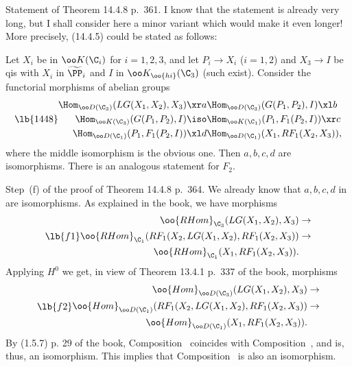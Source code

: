 \documentclass[12pt]{article}
\theoremstyle{remark}
\theoremstyle{definition}
\begin{document}
\begin{s}%
Statement of Theorem 14.4.8 p.~361. I know that the statement is already very long, but I shall consider here a minor variant which would make it even longer! More precisely, (14.4.5) could be stated as follows:

Let $X_i$ be in $\oo K(\C_i)$ for $i=1,2,3$, and let $P_i\to X_i$ ($i=1,2$) and $X_3\to I$ be qis with $X_i$ in $\widetilde\PP_i$ and $I$ in $\oo K_{\oo{hi}}(\C_3)$ (such exist). Consider the functorial morphisms of abelian groups
\begin{equation}\lb{1448}
\begin{split}
\Hom_{\oo D(\C_3)}(LG(X_1,X_2),X_3)&\xr a\Hom_{\oo D(\C_3)}(G(P_1,P_2),I)\xl b\\ 
\Hom_{\oo K(\C_3)}(G(P_1,P_2),I)&\iso\Hom_{\oo K(\C_1)}(P_1,F_1(P_2,I))\xr c\\ 
\Hom_{\oo D(\C_1)}(P_1,F_1(P_2,I))&\xl d\Hom_{\oo D(\C_1)}(X_1,RF_1(X_2,X_3)),
\end{split}
\end{equation}
where the middle isomorphism is the obvious one. Then $a,b,c,d$ are isomorphisms. There is an analogous statement for $F_2$.
\end{s}

%

\begin{s}
Step~(f) of the proof of Theorem 14.4.8 p.~364. We already know that $a,b,c,d$ in  are isomorphisms. As explained in the book, we have morphisms  
\begin{equation}\lb{f1}
\begin{split}
\oo{RHom}_{\C_3}(LG(X_1,X_2),X_3)&\to\\ 
\oo{RHom}_{\C_1}(RF_1(X_2,LG(X_1,X_2),RF_1(X_2,X_3))&\to\\ 
\oo{RHom}_{\C_1}(X_1,RF_1(X_2,X_3)).
\end{split}
\end{equation}
Applying $H^0$ we get, in view of Theorem 13.4.1 p.~337 of the book, morphisms 
\begin{equation}\lb{f2}
\begin{split}
\oo{Hom}_{\oo D(\C_3)}(LG(X_1,X_2),X_3)&\to\\ 
\oo{Hom}_{\oo D(\C_1)}(RF_1(X_2,LG(X_1,X_2),RF_1(X_2,X_3))&\to\\ 
\oo{Hom}_{\oo D(\C_1)}(X_1,RF_1(X_2,X_3)).
\end{split}
\end{equation}
By (1.5.7) p. 29 of the book, Composition~ coincides with Composition~, and is, thus, an isomorphism. This implies that Composition~ is also an isomorphism.
\end{s}
\end{document}
